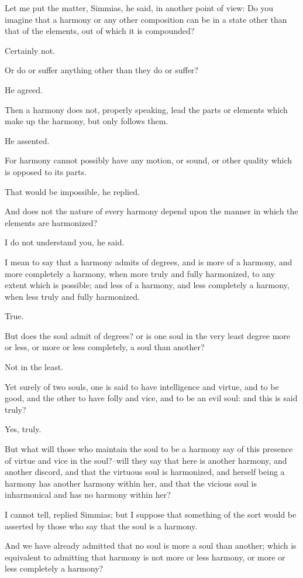 Let me put the matter, Simmias, he said, in another point of view: Do
you imagine that a harmony or any other composition can be in a state
other than that of the elements, out of which it is compounded?

Certainly not.

Or do or suffer anything other than they do or suffer?

He agreed.

Then a harmony does not, properly speaking, lead the parts or elements
which make up the harmony, but only follows them.

He assented.

For harmony cannot possibly have any motion, or sound, or other quality
which is opposed to its parts.

That would be impossible, he replied.

And does not the nature of every harmony depend upon the manner in which
the elements are harmonized?

I do not understand you, he said.

I mean to say that a harmony admits of degrees, and is more of a
harmony, and more completely a harmony, when more truly and fully
harmonized, to any extent which is possible; and less of a harmony, and
less completely a harmony, when less truly and fully harmonized.

True.

But does the soul admit of degrees? or is one soul in the very least
degree more or less, or more or less completely, a soul than another?

Not in the least.

Yet surely of two souls, one is said to have intelligence and virtue,
and to be good, and the other to have folly and vice, and to be an evil
soul: and this is said truly?

Yes, truly.

But what will those who maintain the soul to be a harmony say of this
presence of virtue and vice in the soul?--will they say that here is
another harmony, and another discord, and that the virtuous soul is
harmonized, and herself being a harmony has another harmony within her,
and that the vicious soul is inharmonical and has no harmony within her?

I cannot tell, replied Simmias; but I suppose that something of the sort
would be asserted by those who say that the soul is a harmony.

And we have already admitted that no soul is more a soul than another;
which is equivalent to admitting that harmony is not more or less
harmony, or more or less completely a harmony?

